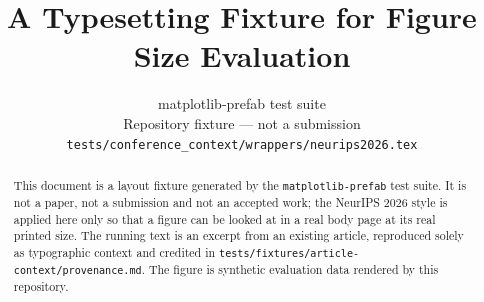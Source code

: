 \documentclass{article}
\title{A Typesetting Fixture for Figure Size Evaluation}
\author{%
  matplotlib-prefab test suite \\
  Repository fixture --- not a submission \\
  \texttt{tests/conference\_context/wrappers/neurips2026.tex}
}
\begin{document}
\maketitle

\begin{abstract}
  This document is a layout fixture generated by the \texttt{matplotlib-prefab}
  test suite. It is not a paper, not a submission and not an accepted work; the
  NeurIPS 2026 style is applied here only so that a figure can be looked at in a
  real body page at its real printed size. The running text is an excerpt from
  an existing article, reproduced solely as typographic context and credited in
  \texttt{tests/fixtures/article-context/provenance.md}. The figure is synthetic
  evaluation data rendered by this repository.
\end{abstract}





\end{document}
